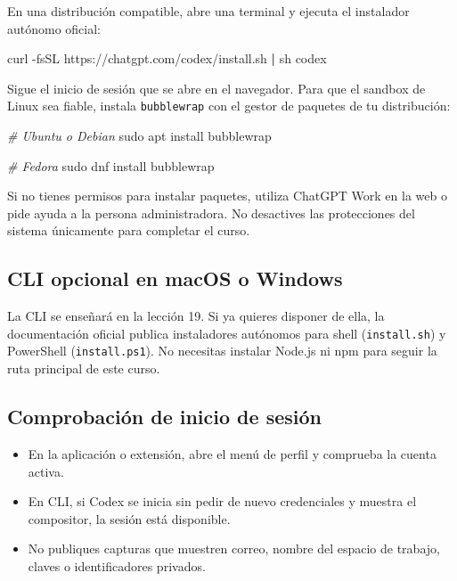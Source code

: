 \documentclass[10pt,a4paper,openany]{book}
\providecommand{\tightlist}{\setlength{\itemsep}{0.18em}\setlength{\parskip}{0pt}}
\newenvironment{Shaded}{}{}
\newcommand{\AttributeTok}[1]{\textcolor[rgb]{0.49,0.56,0.16}{#1}}
\newcommand{\CommentTok}[1]{\textcolor[rgb]{0.38,0.63,0.69}{\textit{#1}}}
\newcommand{\ExtensionTok}[1]{#1}
\newcommand{\FunctionTok}[1]{\textcolor[rgb]{0.02,0.16,0.49}{#1}}
\newcommand{\KeywordTok}[1]{\textcolor[rgb]{0.00,0.44,0.13}{\textbf{#1}}}
\newcommand{\NormalTok}[1]{#1}
\renewenvironment{Shaded}
  {\begin{tcolorbox}[
    enhanced,
    breakable,
    colback=CodeBg,
    colframe=Border,
    boxrule=0.5pt,
    arc=2mm,
    left=3mm,
    right=3mm,
    top=2.2mm,
    bottom=2.2mm,
    before skip=0.8em,
    after skip=0.9em
  ]}
  {\end{tcolorbox}}
\begin{document}
En una distribución compatible, abre una terminal y ejecuta el
instalador autónomo oficial:

\begin{Shaded}
\begin{Highlighting}[]
\ExtensionTok{curl} \AttributeTok{{-}fsSL}\NormalTok{ https://chatgpt.com/codex/install.sh }\KeywordTok{|} \FunctionTok{sh}
\ExtensionTok{codex}
\end{Highlighting}
\end{Shaded}

Sigue el inicio de sesión que se abre en el navegador. Para que el
sandbox de Linux sea fiable, instala \texttt{bubblewrap} con el gestor
de paquetes de tu distribución:

\begin{Shaded}
\begin{Highlighting}[]
\CommentTok{\# Ubuntu o Debian}
\FunctionTok{sudo}\NormalTok{ apt install bubblewrap}

\CommentTok{\# Fedora}
\FunctionTok{sudo}\NormalTok{ dnf install bubblewrap}
\end{Highlighting}
\end{Shaded}

Si no tienes permisos para instalar paquetes, utiliza ChatGPT Work en la
web o pide ayuda a la persona administradora. No desactives las
protecciones del sistema únicamente para completar el curso.

\subsection{CLI opcional en macOS o
Windows}\label{cli-opcional-en-macos-o-windows}

La CLI se enseñará en la lección 19. Si ya quieres disponer de ella, la
documentación oficial publica instaladores autónomos para shell
(\texttt{install.sh}) y PowerShell (\texttt{install.ps1}). No necesitas
instalar Node.js ni npm para seguir la ruta principal de este curso.

\subsection{Comprobación de inicio de
sesión}\label{comprobaciuxf3n-de-inicio-de-sesiuxf3n}

\begin{itemize}
\tightlist
\item
  En la aplicación o extensión, abre el menú de perfil y comprueba la
  cuenta activa.
\item
  En CLI, si Codex se inicia sin pedir de nuevo credenciales y muestra
  el compositor, la sesión está disponible.
\item
  No publiques capturas que muestren correo, nombre del espacio de
  trabajo, claves o identificadores privados.
\end{itemize}
\end{document}
